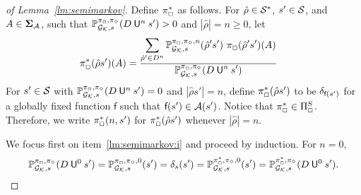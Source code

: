 \begin{proof}[of Lemma~\ref{lm:semimarkov}]
  Define $\pi^*_{{\Box}}$ as follows.
  For $\hat{\rho}\in\mathcal{S}^*$, $s'\in\mathcal{S}$, and $A\in\bm{\Sigma}_{\mathcal{A}}$,
  such that
  $\mathbb{P}^{\pi_{{\Box}},\pi_{{\Diamond}}}_{{\mathcal{G}_{\mathcal{K}}},s}(D \mathbin{\mathsf{U}}^n s') > 0$
  and $|\hat{\rho}| = n\geq 0$, let
  \begin{align*}
  \pi^*_{{\Box}}(\hat{\rho}s')(A)
  & =
  \frac{\displaystyle\sum_{\hat{\rho}'\in D^n}\mathbb{P}^{\pi_{{\Box}},\pi_{{\Diamond}},n}_{{\mathcal{G}_{\mathcal{K}}},s}(\hat{\rho}'s')\ \pi_{{\Box}}(\hat{\rho}' s')(A)}{\displaystyle\mathbb{P}^{\pi_{{\Box}},\pi_{{\Diamond}}}_{{\mathcal{G}_{\mathcal{K}}},s}(D \mathbin{\mathsf{U}}^n s')}
  \end{align*}
  For $s'\in\mathcal{S}$ with
  $\mathbb{P}^{\pi_{{\Box}},\pi_{{\Diamond}}}_{{\mathcal{G}_{\mathcal{K}}},s}(D \mathbin{\mathsf{U}}^n s') = 0$
  and $|\hat{\rho}s'| = n$, define
  $\pi^*_{{\Box}}(\hat{\rho}s')$ to be
  $\delta_{\textsf{f}(s')}$ for a globally fixed function $\textsf{f}$
  such that $\textsf{f}(s')\in\mathcal{A}(s')$.
  Notice that
  $\pi^*_{{\Box}}\in\Pi_{{\Box}}^{\textsl{S}}$.
  Therefore, we write $\pi^*_{{\Box}}(n,s')$ for
  $\pi^*_{{\Box}}(\hat{\rho}s')$ whenever
  $|\hat{\rho}|=n$.

  We focus first on item~\ref{lm:semimarkov:i} and proceed by induction.
  For $n=0$,
  \[\mathbb{P}^{\pi_{{\Box}},\pi_{{\Diamond}}}_{{\mathcal{G}_{\mathcal{K}}},s}(D \mathbin{\mathsf{U}}^0 s') =
  \mathbb{P}^{\pi_{{\Box}},\pi_{{\Diamond}},0}_{{\mathcal{G}_{\mathcal{K}}},s}(s') = \delta_s(s') =
  \mathbb{P}^{\pi^*_{{\Box}},\pi_{{\Diamond}},0}_{{\mathcal{G}_{\mathcal{K}}},s}(s')=
  \mathbb{P}^{\pi^*_{{\Box}},\pi_{{\Diamond}}}_{{\mathcal{G}_{\mathcal{K}}},s}(D \mathbin{\mathsf{U}}^0 s').\]



\end{proof}
